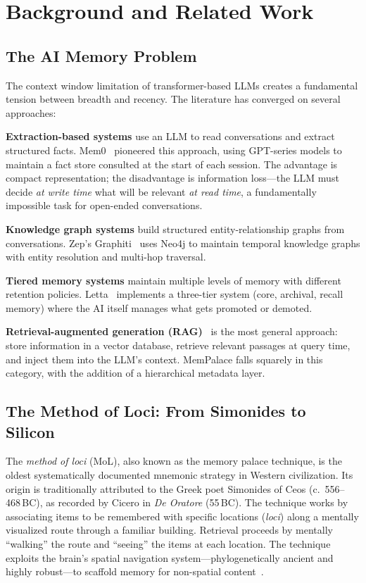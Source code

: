 \documentclass[twoside,11pt]{article}
\begin{document}
\section{Background and Related Work}
\label{sec:background}

\subsection{The AI Memory Problem}

The context window limitation of transformer-based LLMs creates a fundamental
tension between breadth and recency.  The literature has converged on several
approaches:

\textbf{Extraction-based systems} use an LLM to read conversations and extract
structured facts.  Mem0~\citep{mem0} pioneered this approach, using GPT-series
models to maintain a fact store consulted at the start of each session.  The
advantage is compact representation; the disadvantage is information
loss---the LLM must decide \emph{at write time} what will be relevant \emph{at
read time}, a fundamentally impossible task for open-ended conversations.

\textbf{Knowledge graph systems} build structured entity-relationship graphs
from conversations.  Zep's Graphiti~\citep{zep} uses Neo4j to maintain
temporal knowledge graphs with entity resolution and multi-hop traversal.

\textbf{Tiered memory systems} maintain multiple levels of memory with
different retention policies.  Letta~\citep{letta} implements a three-tier
system (core, archival, recall memory) where the AI itself manages what gets
promoted or demoted.

\textbf{Retrieval-augmented generation (RAG)}~\citep{rag} is the most general
approach: store information in a vector database, retrieve relevant passages at
query time, and inject them into the LLM's context.  MemPalace falls squarely
in this category, with the addition of a hierarchical metadata layer.

\subsection{The Method of Loci: From Simonides to Silicon}
\label{sec:mol}

The \emph{method of loci} (MoL), also known as the memory palace technique,
is the oldest systematically documented mnemonic strategy in Western
civilization.  Its origin is traditionally attributed to the Greek poet
Simonides of Ceos (c.\ 556--468\,BC), as recorded by Cicero in \emph{De
Oratore} (55\,BC)\@.  The technique works by associating items to be
remembered with specific locations (\emph{loci}) along a mentally visualized
route through a familiar building.  Retrieval proceeds by mentally ``walking''
the route and ``seeing'' the items at each location.  The technique exploits
the brain's spatial navigation system---phylogenetically ancient and highly
robust---to scaffold memory for non-spatial content~\citep{okeefe1978}.
\end{document}
